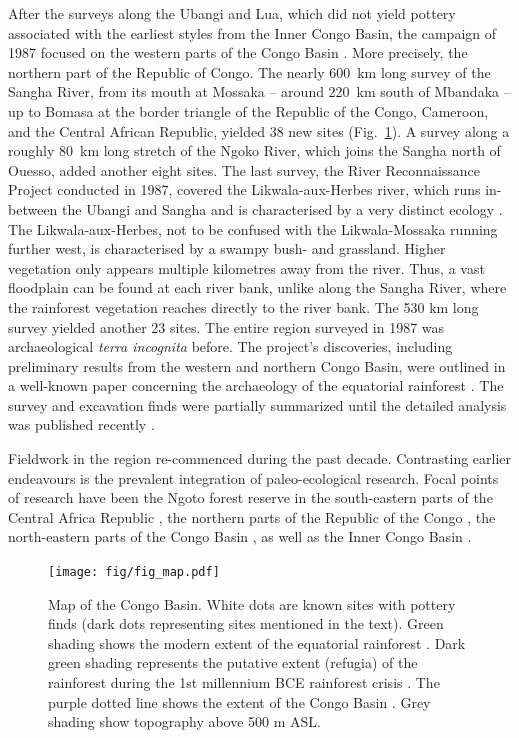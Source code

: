 \documentclass[smallextended,natbib]{svjour3}       %
\begin{document}
After the surveys along the Ubangi and Lua, which did not yield pottery associated with the earliest styles from the Inner Congo Basin, the campaign of 1987 focused on the western parts of the Congo Basin \citep{Eggert.1992}. More precisely, the northern part of the Republic of Congo. The nearly 600~km long survey of the Sangha River, from its mouth at Mossaka – around 220~km south of Mbandaka – up to Bomasa at the border triangle of the Republic of the Congo, Cameroon, and the Central African Republic, yielded 38 new sites (Fig.~\ref{fig:map}). A survey along a roughly 80~km long stretch of the Ngoko River, which joins the Sangha north of Ouesso, added another eight sites. The last survey, the River Reconnaissance Project conducted in 1987, covered the Likwala-aux-Herbes river, which runs in-between the Ubangi and Sangha and is characterised by a very distinct ecology \citep{Philippon.2019}. The Likwala-aux-Herbes, not to be confused with the Likwala-Mossaka running further west, is characterised by a swampy bush- and grassland. Higher vegetation only appears multiple kilometres away from the river. Thus, a vast floodplain can be found at each river bank, unlike along the Sangha River, where the rainforest vegetation reaches directly to the river bank. The 530 km long survey yielded another 23 sites. The entire region surveyed in 1987 was archaeological \textit{terra incognita} before. The project’s discoveries, including preliminary results from the western and northern Congo Basin, were outlined in a well-known paper concerning the archaeology of the equatorial rainforest \citep{Eggert.1993}. The survey and excavation finds were partially summarized \citep{Seidensticker.2016b} until the detailed analysis was published recently \citep{Seidensticker.2021e}. 

Fieldwork in the region re-commenced during the past decade. Contrasting earlier endeavours is the prevalent integration of paleo-ecological research. Focal points of research have been the Ngoto forest reserve in the south-eastern parts of the Central Africa Republic \citep{Kiahtipes.2011,Lupo.2015,Kiahtipes.2016,Lupo.2021}, the northern parts of the Republic of the Congo \citep{Gillet.2013,MorinRivat.2014,Morin-Rivat.2017a}, the north-eastern parts of the Congo Basin \citep{Cornelissen.2013,LivingstoneSmith.2011,LivingstoneSmith.2017}, as well as the Inner Congo Basin \citep{Neumann.2022}.

\begin{figure}[!tb]
	\texttt{[image: fig/fig\_map.pdf]}
	\caption{Map of the Congo Basin. White dots are known sites with pottery finds (dark dots representing sites mentioned in the text). Green shading shows the modern extent of the equatorial rainforest \citep{White.1983}. Dark green shading represents the putative extent (refugia) of the rainforest during the 1st millennium BCE rainforest crisis \citep{Bremond.2017,Maley.2017}. The purple dotted line shows the extent of the Congo Basin \citep[11]{Runge.2001}. Grey shading show topography above 500 m ASL.}
	\label{fig:map}
\end{figure}
\end{document}
